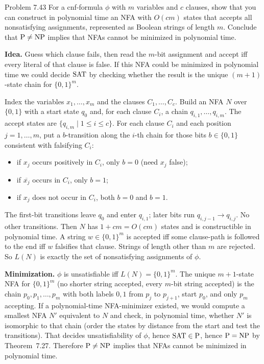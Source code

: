 \begin{question}{Problem 7.43}
For a cnf-formula $\phi$ with $m$ variables and $c$ clauses, show that you can construct in polynomial time an NFA with $O(cm)$ states that accepts all nonsatisfying assignments, represented as Boolean strings of length $m$. Conclude that $\mathrm{P}\neq\mathrm{NP}$ implies that NFAs cannot be minimized in polynomial time.
\end{question}
\begin{soln}
\textbf{Idea.} Guess which clause fails, then read the $m$-bit assignment and accept iff every literal of that clause is false. If this NFA could be minimized in polynomial time we could decide $\mathrm{SAT}$ by checking whether the result is the unique $(m+1)$-state chain for $\{0,1\}^m$.

Index the variables $x_1,\ldots,x_m$ and the clauses $C_1,\ldots,C_c$. Build an NFA $N$ over $\{0,1\}$ with a start state $q_0$ and, for each clause $C_i$, a chain $q_{i,1},\ldots,q_{i,m}$. The accept states are $\{q_{i,m}\mid 1\le i\le c\}$. For each clause $C_i$ and each position $j=1,\ldots,m$, put a $b$-transition along the $i$-th chain for those bits $b\in\{0,1\}$ consistent with falsifying $C_i$:
\begin{itemize}
\item if $x_j$ occurs positively in $C_i$, only $b=0$ (need $x_j$ false);
\item if $\overline{x_j}$ occurs in $C_i$, only $b=1$;
\item if $x_j$ does not occur in $C_i$, both $b=0$ and $b=1$.
\end{itemize}
The first-bit transitions leave $q_0$ and enter $q_{i,1}$; later bits run $q_{i,j-1}\to q_{i,j}$. No other transitions. Then $N$ has $1+cm=O(cm)$ states and is constructible in polynomial time. A string $w\in\{0,1\}^m$ is accepted iff some clause-path is followed to the end iff $w$ falsifies that clause. Strings of length other than $m$ are rejected. So $L(N)$ is exactly the set of nonsatisfying assignments of $\phi$.

\textbf{Minimization.}
$\phi$ is unsatisfiable iff $L(N)=\{0,1\}^m$. The unique $m+1$-state NFA for $\{0,1\}^m$ (no shorter string accepted, every $m$-bit string accepted) is the chain $p_0,p_1,\ldots,p_m$ with both labels $0,1$ from $p_j$ to $p_{j+1}$, start $p_0$, and only $p_m$ accepting. If a polynomial-time NFA-minimizer existed, we would compute a smallest NFA $N'$ equivalent to $N$ and check, in polynomial time, whether $N'$ is isomorphic to that chain (order the states by distance from the start and test the transitions). That decides unsatisfiability of $\phi$, hence $\mathrm{SAT}\in\mathrm{P}$, hence $\mathrm{P}=\mathrm{NP}$ by Theorem~7.27. Therefore $\mathrm{P}\neq\mathrm{NP}$ implies that NFAs cannot be minimized in polynomial time.
\end{soln}

